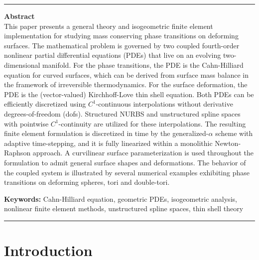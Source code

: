 \documentclass[11pt]{article}
\begin{document}


\rule{\linewidth}{.15mm}
{\bf Abstract}\\
This paper presents a general theory and isogeometric finite element implementation for studying mass conserving phase transitions on deforming surfaces.
The mathematical problem is governed by two coupled fourth-order nonlinear partial differential equations (PDEs) that live on an evolving two-dimensional manifold.
For the phase transitions, the PDE is the Cahn-Hilliard equation for curved surfaces, which can be derived from surface mass balance in the framework of irreversible thermodynamics. 
For the surface deformation, the PDE is the (vector-valued) Kirchhoff-Love thin shell equation.
Both PDEs can be efficiently discretized using $C^1$-continuous interpolations without derivative degrees-of-freedom (dofs).
Structured NURBS and unstructured spline spaces with pointwise $C^1$-continuity are utilized for these interpolations.
The resulting finite element formulation is discretized in time by the generalized-$\alpha$ scheme with adaptive time-stepping, and it is fully linearized within a monolithic Newton-Raphson approach.
A curvilinear surface parameterization is used throughout the formulation to admit general surface shapes and deformations.
The behavior of the coupled system is illustrated by several numerical examples exhibiting phase transitions on deforming spheres, tori and double-tori.

{\bf Keywords:}
Cahn-Hilliard equation, geometric PDEs, isogeometric analysis, nonlinear finite element methods, unstructured spline spaces, thin shell theory


\vspace{-4mm}
\rule{\linewidth}{.15mm}


\tableofcontents


\section{Introduction}
\end{document}

